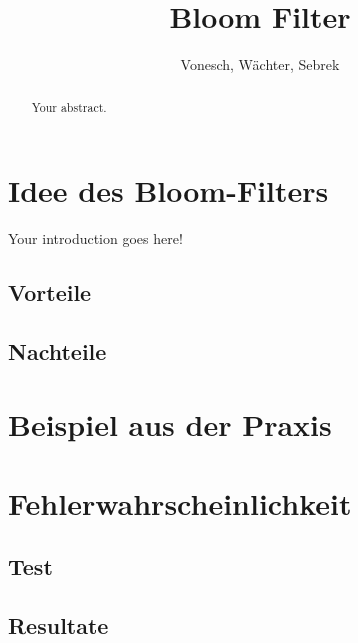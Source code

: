 \documentclass[11pt]{article}
\title{Bloom Filter}
\author{Vonesch, Wächter, Sebrek}
\begin{document}
    \maketitle
    \begin{abstract}
        Your abstract.
    \end{abstract}

    \section{Idee des Bloom-Filters}

    Your introduction goes here!


    \subsection{Vorteile}

    \subsection{Nachteile}

    \section{Beispiel aus der Praxis}

    \section{Fehlerwahrscheinlichkeit}

    \subsection{Test}

    \subsection{Resultate}
\end{document}
